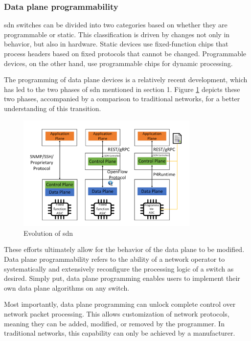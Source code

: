 \subsubsection{Data plane programmability}
\gls{sdn} switches can be divided into two categories based on whether they are programmable or static\cite{peterson_software-defined_2021}. This classification is driven by changes not only in behavior, but also in hardware. Static devices use fixed-function chips that process headers based on fixed protocols that cannot be changed. Programmable devices, on the other hand, use programmable chips for dynamic processing. 

The programming of data plane devices is a relatively recent development, which has led to the two phases of \gls{sdn} mentioned in section 1. Figure \ref{fig:sdn_evolution} depicts these two phases, accompanied by a comparison to traditional networks, for a better understanding of this transition.

\begin{figure}
	\centering
	\includegraphics[width=0.8\textwidth]{Chapters/Figures/SDNs/sdn_evolution.png}
	\caption{Evolution of \gls{sdn}\cite{liatifis_advancing_2023}}
	\label{fig:sdn_evolution}
\end{figure}

These efforts ultimately allow for the behavior of the data plane to be modified. Data plane programmability refers to the ability of a network operator to systematically and extensively reconfigure the processing logic of a switch as desired\cite{bifulco_survey_2018}\cite{hauser_survey_2021}. Simply put, data plane programming enables users to implement their own data plane algorithms on any switch. 

Most importantly, data plane programming can unlock complete control over network packet processing. This allows customization of network protocols, meaning they can be added, modified, or removed by the programmer. In traditional networks, this capability can only be achieved by a manufacturer\cite{hauser_survey_2021}. 

